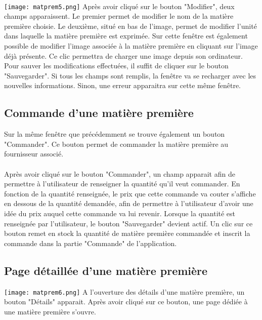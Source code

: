 \paragraph{}
\texttt{[image: matprem5.png]}
Après avoir cliqué sur le bouton "Modifier", deux champs apparaissent. Le 
premier permet de modifier le nom de la matière première choisie. Le deuxième, 
situé en bas de l'image, permet de modifier l'unité dans laquelle la matière 
première est exprimée. Sur cette fenêtre est également possible de modifier 
l'image associée à la matière première en cliquant sur l'image déjà présente. 
Ce clic permettra de charger une image depuis son ordinateur. Pour sauver les 
modifications effectuées, il suffit de cliquer sur le bouton "Sauvegarder". Si 
tous les champs sont remplis, la fenêtre va se recharger avec les nouvelles 
informations. Sinon, une erreur apparaitra sur cette même fenêtre.

\subsection{Commande d'une matière première}
Sur la même fenêtre que précédemment se trouve également un bouton "Commander". 
Ce bouton permet de commander la matière première au fournisseur associé.

\paragraph{}
Après avoir cliqué sur le bouton "Commander", un champ apparait afin de 
permettre à l'utilisateur de renseigner la quantité qu'il veut commander. 
En fonction de la quantité renseignée, le prix que cette commande va couter 
s'affiche en dessous de la quantité demandée, afin de permettre à l'utilisateur 
d'avoir une idée du prix auquel cette commande va lui revenir. Lorsque la 
quantité est renseignée par l'utilisateur, le bouton "Sauvegarder" devient 
actif. Un clic sur ce bouton remet en stock la quantité de matière première 
commandée et inscrit la commande dans la partie "Commande" de l'application.

\subsection{Page détaillée d'une matière première}
\texttt{[image: matprem6.png]}
A l'ouverture des détails d'une matière première, un bouton "Détails" apparait. 
Après avoir cliqué sur ce bouton, une page dédiée à une matière première 
s'ouvre. 

